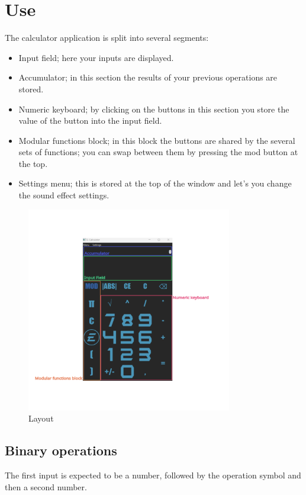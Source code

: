 \documentclass{article}
\begin{document}
	\section{Use}
	The calculator application is split into several segments:
	\begin{itemize}
		\item{Input field; here your inputs are displayed.}
		\item{Accumulator; in this section the results of your previous operations are stored.}
		\item{Numeric keyboard; by clicking on the buttons in this section you store the value of the button into the input field.}
		\item{Modular functions block; in this block the buttons are shared by the several sets of functions; you can swap between them by pressing the mod button at the top.}
		\item{Settings menu; this is stored at the top of the window and let's you change the sound effect settings.}
	\end{itemize}
	\begin{figure}[H]
		\centering
		\includegraphics[width=0.8\textwidth]{kalkulacka_comment.png}
		\caption{Layout}
		\label{fig:enter-label}
	\end{figure}
	
	\subsection{Binary operations}
	The first input is expected to be a number, followed by the operation symbol and then a second number.
	
\end{document}
